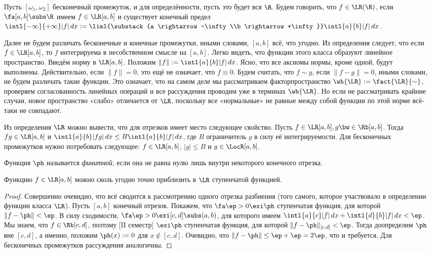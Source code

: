 \documentclass[a4paper]{article}
\newcommand{\intlab}{\intl{a}{b}}
\newcommand{\intlii}{\intl{-\infty}{+\infty}}
\begin{document}
Пусть $[\omega_1,\omega_2]$ бесконечный промежуток, и для определённости, пусть это будет вся
$\R$. Будем говорить, что $f \in\LR(\R)$, если $\fa [a,b] \subs \R$ имеем $f \in\LR[a,b]$ и
существует конечный предел $\intlii |f|\,d x := \liml{\substack{a \rightarrow -\infty\\b
\rightarrow +\infty}}\intlab |f|\,d x$.

Далее не будем различать бесконечные и конечные промежутки, иными словами, $[a,b]$ всё, что
угодно. Из определения следует, что если $f \in\LR[a,b]$, то $f$ интегрируема в несобственном
смысле на $[a,b]$. Легко видеть, что функции этого класса образуют линейное пространство. Введём
норму в $\LR[a,b]$. Положим $\|f\| := \intlab |f|\,d x$. Ясно, что все аксиомы нормы, кроме одной,
будут выполнены. Действительно, если $\|f\| = 0$, это ещё не означает, что $f \equiv 0$. Будем
считать, что $f\sim g$, если $\|f-g\| = 0$, иными словами, не будем различать такие функции. Это
означает, что на самом деле мы рассматриваем факторпространство $\wh{\LR} := \fact{\LR}{\sim}$,
проверяем согласованность линейных операций и все рассуждения проводим уже в терминах $\wh{\LR}$.
Но если не рассматривать крайние случаи, новое пространство «слабо» отличается от $\LR$, поскольку
все «нормальные» не равные между собой функции по этой норме всё-таки не совпадают.

Из определения $\LR$ можно вывести, что для отрезков имеет место следующее свойство. Пусть $f
\in\LR[a,b], g\bw\in\Rb[a,b]$. Тогда $fg \in\LR[a,b]$ и $\intlab |fg|\,d x \le B\intlab |f|\,d x$,
где $B$ ограничитель $g$ в силу её интегрируемости. Для бесконечных промежутков нужно
потребовать следующее: $f \in\LR[a,b]$, $|g| \le B$ и $g \in\LocR[a,b]$.

\begin{df}
Функция $\ph$ называется \emph{финитной}, если она не равна нулю лишь внутри некоторого конечного отрезка.
\end{df}

\begin{theorem}
Функцию $f \in\LR[a,b]$ можно сколь угодно точно приблизить в $\LR$ ступенчатой функцией.
\end{theorem}
\begin{proof}
Совершенно очевидно, что всё сводится к рассмотрению одного отрезка разбиения (того самого, которое
участвовало в определении функции класса $\LR$). Пусть $[a,b]$ конечный отрезок. Покажем, что
$\fa \ep > 0 \exi \ph$ ступенчатая функция, для которой $\|f - \ph\| < \ep$. В силу сходимости,
$\fa \ep > 0 \exi [c,d] \subs (a,b)$, для которого имеем $\intl{a}{c}|f|\,d x + \intl{d}{b}|f|\,d
x < \ep$. Мы знаем, что $f \in\Rb[c,d]$, поэтому [II семестр] $\exi \ph$ ступенчатая функция,
для которой $\|f - \ph\|_{[c,d]} < \ep$. Тогда доопределим $\ph$ вне $[c,d]$, а именно, положим
$\ph(x) := 0$ для $x \notin [c,d]$. Очевидно, что $\|f - \ph\| \le \ep + \ep = 2\ep$, что и
требуется. Для бесконечных промежутков рассуждения аналогичны.
\end{proof}
\end{document}
